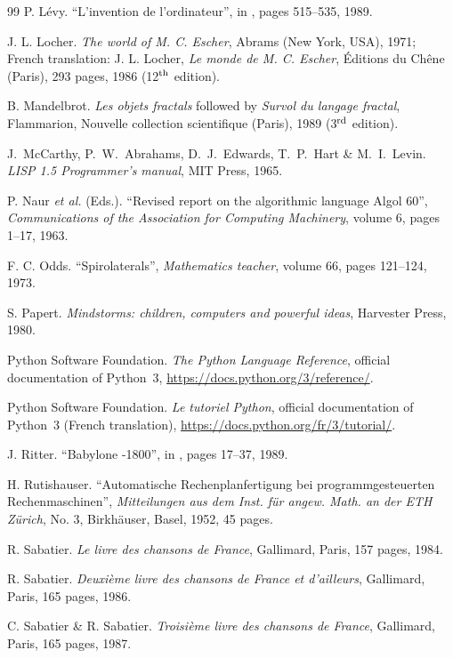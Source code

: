 \begin{thebibliography}{99}
 P. Lévy.
``L'invention de l'ordinateur'', \rm in \cite{serres1}, pages 515--535, 1989.

 J. L. Locher.
{\em The world of M. C. Escher}, Abrams (New York, USA), 1971\/\/;
{\footnotesize French translation:} J. L. Locher,
{\em Le monde de M. C. Escher}, Éditions du Chêne (Paris), 
293 pages, 1986 (12$^{\rm th}$ edition).

 B. Mandelbrot.
{\em Les objets fractals} {\footnotesize followed by} {\em Survol du langage
fractal}, Flammarion, Nouvelle collection scientifique (Paris), 1989
(3$^{\rm rd}$ edition).

 J.~McCarthy, P.~W.~Abrahams, D.~J.~Edwards, T.~P.~Hart
\& M.~I.~Levin.
{\em LISP 1.5 Programmer's manual}, 
MIT Press, 1965.

 P. Naur {\em et al.}  (Eds.).
``Revised report on the algorithmic language Algol 60'', 
{\em Communications of the Association for Computing Machinery}, 
volume 6, pages 1--17, 1963.

 F. C. Odds.
``Spirolaterals'', {\em Mathematics teacher}, volume 66, pages 121--124, 1973.

 S. Papert.
{\em Mindstorms: children, computers and powerful ideas}, Harvester Press, 
1980.

 Python Software Foundation.
{\em The Python Language Reference}, official documentation of Python~3,
\url{https://docs.python.org/3/reference/}.

 Python Software Foundation.
{\em Le tutoriel Python}, official documentation of Python~3 (French translation),
\url{https://docs.python.org/fr/3/tutorial/}.

 J. Ritter.
``Babylone -1800'', \rm in \cite{serres1}, pages 17--37, 1989.

 H. Rutishauser.
``Automatische Rechenplanfertigung bei programmgesteuerten
Rechenmaschinen'', {\em Mitteilungen aus dem Inst. für angew. Math. an der ETH 
Zürich}, No. 3, Birkhäuser, Basel, 1952, 45 pages.

 R. Sabatier.
{\em Le livre des chansons de France}, Gallimard, Paris, 157 pages, 1984.

 R. Sabatier.
{\em Deuxième livre des chansons de France et d'ailleurs}, 
Gallimard, Paris, 165 pages, 1986.

 C. Sabatier \& R. Sabatier.
{\em Troisième livre des chansons de France}, 
Gallimard, Paris, 165 pages, 1987.


\end{thebibliography}
